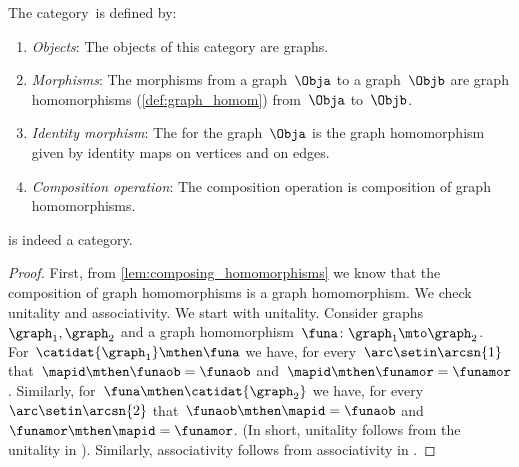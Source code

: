 \begin{ctdefinition}
    \label{def:Grph}
    The category~\Grph is defined by:
    \begin{enumerate}
        \item \emph{Objects}: The objects of this category are graphs.
        \item \emph{Morphisms}: The morphisms from a graph~$\Obja$ to a graph~$\Objb$ are graph homomorphisms (\cref{def:graph_homom}) from~$\Obja$ to~$\Objb$.
        \item \emph{Identity morphism}: The  for the graph~$\Obja$
              is the graph homomorphism given by identity maps on vertices and on edges.
        \item \emph{Composition operation}: The composition operation is composition of graph homomorphisms.
    \end{enumerate}
\end{ctdefinition}

\begin{lemma}\label{lem:Grph-is-cat}
    \Grph is indeed a category.
\end{lemma}

\begin{proof}
    First, from \cref{lem:composing_homomorphisms} we know that the composition of graph homomorphisms is a graph homomorphism.
    We check unitality and associativity.
    We start with unitality.
    Consider graphs~$\graph_1,\graph_2$ and a graph homomorphism~$\funa\colon \graph_1\mto \graph_2$.
    For~$\catidat{\graph_1}\mthen \funa$ we have, for every~$\arc \setin \arcsn{1}$ that~$\mapid\mthen \funaob=\funaob$ and~$\mapid\mthen \funamor=\funamor$.
    Similarly, for~$\funa \mthen \catidat{\graph_2}$ we have, for every~$\arc \setin \arcsn{2}$ that~$\funaob\mthen \mapid=\funaob$ and~$\funamor \mthen \mapid=\funamor$.
    (In short, unitality follows from the unitality in \Set).
    Similarly, associativity follows from associativity in \Set.
\end{proof}
